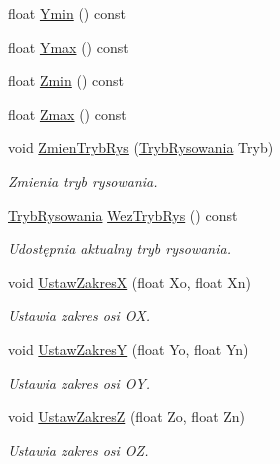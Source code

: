 \begin{DoxyCompactItemize}
\item 
float \hyperlink{class_pz_g_1_1_lacze_do_g_n_u_plota_a9352c0382bfaeaaba9f65399a7383164}{Ymin} () const
\item 
float \hyperlink{class_pz_g_1_1_lacze_do_g_n_u_plota_ac54e4e7448ce3bd324efdc94a999f535}{Ymax} () const
\item 
float \hyperlink{class_pz_g_1_1_lacze_do_g_n_u_plota_a9068bd9a9873ba9c6d70016f1ae7cd7f}{Zmin} () const
\item 
float \hyperlink{class_pz_g_1_1_lacze_do_g_n_u_plota_a20a5d03e1fc19c682032bffc54340f12}{Zmax} () const
\item 
void \hyperlink{class_pz_g_1_1_lacze_do_g_n_u_plota_a10950349b348fd3a3d4143e95337527c}{Zmien\+Tryb\+Rys} (\hyperlink{namespace_pz_g_aeedae1ef10c66d720f9e89de408ca4ca}{Tryb\+Rysowania} Tryb)
\begin{DoxyCompactList}\small\item\em Zmienia tryb rysowania. \end{DoxyCompactList}\item 
\hyperlink{namespace_pz_g_aeedae1ef10c66d720f9e89de408ca4ca}{Tryb\+Rysowania} \hyperlink{class_pz_g_1_1_lacze_do_g_n_u_plota_a7c417f27b4b112f58a5be3ce6ea8d1fe}{Wez\+Tryb\+Rys} () const
\begin{DoxyCompactList}\small\item\em Udostępnia aktualny tryb rysowania. \end{DoxyCompactList}\item 
void \hyperlink{class_pz_g_1_1_lacze_do_g_n_u_plota_a9c91987dfc869d6fcea96205c581daef}{Ustaw\+ZakresX} (float Xo, float Xn)
\begin{DoxyCompactList}\small\item\em Ustawia zakres osi {\itshape OX}. \end{DoxyCompactList}\item 
void \hyperlink{class_pz_g_1_1_lacze_do_g_n_u_plota_a54c6e9cf9ab2eae479451fd953c2717c}{Ustaw\+ZakresY} (float Yo, float Yn)
\begin{DoxyCompactList}\small\item\em Ustawia zakres osi {\itshape OY}. \end{DoxyCompactList}\item 
void \hyperlink{class_pz_g_1_1_lacze_do_g_n_u_plota_a1dbbb2b86fb13b8632e6bad9df2a82e3}{Ustaw\+ZakresZ} (float Zo, float Zn)
\begin{DoxyCompactList}\small\item\em Ustawia zakres osi {\itshape OZ}. \end{DoxyCompactList}\item 

\end{DoxyCompactItemize}

